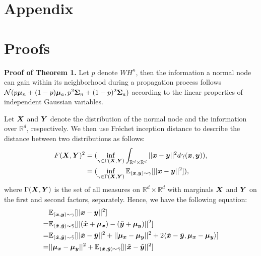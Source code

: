 \appendix
\newpage

\section*{Appendix}
\label{sec:appendix}

\section{Proofs}
\label{subsec:proof}
{\bf Proof of Theorem 1.}
Let $p$ denote $WH^\kappa$, then the information a normal node can gain within its neighborhood during a propagation process follows $\mathcal{N}(p\boldsymbol{\mu}_n+(1-p)\boldsymbol{\mu}_a, p^2\boldsymbol{\Sigma}_n+(1-p)^2\boldsymbol{\Sigma}_a)$ according to the linear properties of independent Gaussian variables. 

Let $\boldsymbol{X}$ and $\boldsymbol{Y}$ denote the distribution of the normal node and the information over $\mathbb{R}^d$, respectively. We then use Fréchet inception distance \citep{fid17heusel} to describe the distance between two distributions as follows: 
\begin{equation*}
\begin{aligned}
    F(\boldsymbol{X}, \boldsymbol{Y})^2&=(\inf_{\gamma\in \Gamma(\boldsymbol{X}, \boldsymbol{Y})}\int_{\mathbb{R}^d \times \mathbb{R}^d}||\boldsymbol{x}-\boldsymbol{y}||^2d\gamma(\boldsymbol{x}, \boldsymbol{y})), \\
    &=(\inf_{\gamma\in \Gamma(\boldsymbol{X}, \boldsymbol{Y})}\mathbb{E}_{(\boldsymbol{x}, \boldsymbol{y})\sim\gamma}[||\boldsymbol{x}-\boldsymbol{y}||^2]),
\end{aligned}
\end{equation*}
where $\Gamma(\boldsymbol{X}, \boldsymbol{Y})$ is the set of all measures on $\mathbb{R}^d\times\mathbb{R}^d$ with marginals $\boldsymbol{X}$ and $\boldsymbol{Y}$ on the first and second factors, separately. Hence, we have the following equation: 
\begin{equation*}
\begin{aligned}
    &\mathbb{E}_{(\boldsymbol{x}, \boldsymbol{y})\sim\gamma}[||\boldsymbol{x}-\boldsymbol{y}||^2]\\
    =&\mathbb{E}_{(\tilde{\boldsymbol{x}}, \tilde{\boldsymbol{y}})\sim\tilde{\gamma}}[||(\tilde{\boldsymbol{x}}+\boldsymbol{\mu_x})-(\tilde{\boldsymbol{y}}+\boldsymbol{\mu_y})||^2]\\
    =&\mathbb{E}_{(\tilde{\boldsymbol{x}}, \tilde{\boldsymbol{y}})\sim\tilde{\gamma}}[||\tilde{\boldsymbol{x}}-\tilde{\boldsymbol{y}}||^2+||\boldsymbol{\mu_x}-\boldsymbol{\mu_y}||^2+2\langle \tilde{\boldsymbol{x}}-\tilde{\boldsymbol{y}}, \boldsymbol{\mu_x}-\boldsymbol{\mu_y}\rangle]\\
    =&||\boldsymbol{\mu_x}-\boldsymbol{\mu_y}||^2+\mathbb{E}_{(\tilde{\boldsymbol{x}}, \tilde{\boldsymbol{y}})\sim\tilde{\gamma}}[||\tilde{\boldsymbol{x}}-\tilde{\boldsymbol{y}}||^2]
\end{aligned}
\end{equation*}
